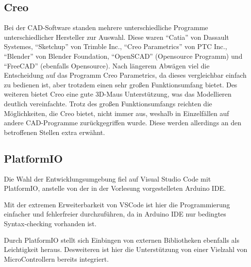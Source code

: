 \subsection{Creo}
Bei der CAD-Software standen mehrere unterschiedliche Programme unterschiedlicher Hersteller zur Auswahl.
Diese waren ``Catia'' von Dassault Systemes, ``Sketchup'' von Trimble Inc., ``Creo Parametrics'' von PTC Inc., ``Blender'' von Blender Foundation, ``OpenSCAD'' (Opensource Programm) und ``FreeCAD'' (ebenfalls Opensource).
Nach längerem Abwägen viel die Entscheidung auf das Programm Creo Parametrics, da dieses vergleichbar einfach zu bedienen ist, aber trotzdem einen sehr großen Funktionsumfang bietet.
Des weiteren bietet Creo eine gute 3D-Maus Unterstützung, was das Modellieren deutlich vereinfachte.
Trotz des großen Funktionsumfangs reichten die Möglichkeiten, die Creo bietet, nicht immer aus, weshalb in Einzelfällen auf andere CAD-Programme zurückgegriffen wurde. Diese werden allerdings an den betroffenen Stellen extra erwähnt. 

\subsection{PlatformIO}
Die Wahl der Entwicklungsumgebung fiel auf Visual Studio Code mit PlatformIO, anstelle von der in der Vorlesung vorgestelleten Arduino IDE.

Mit der extremen Erweiterbarkeit von VSCode ist hier die Programmierung einfacher und fehlerfreier durchzuführen, da in Arduino IDE nur bedingtes Syntax-checking vorhanden ist.

Durch PlatformIO stellt sich Einbingen von externen Bibliotheken ebenfalls als Leichtigkeit heraus.
Desweiteren ist hier die Unterstützung von einer Vielzahl von MicroControllern bereits integriert.